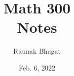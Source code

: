 \documentclass{article}
\begin{document}
\title{Math 300\\Notes}
\author{Raunak Bhagat}
\date{Feb. 6, 2022}
\maketitle

\newpage

\end{document}
